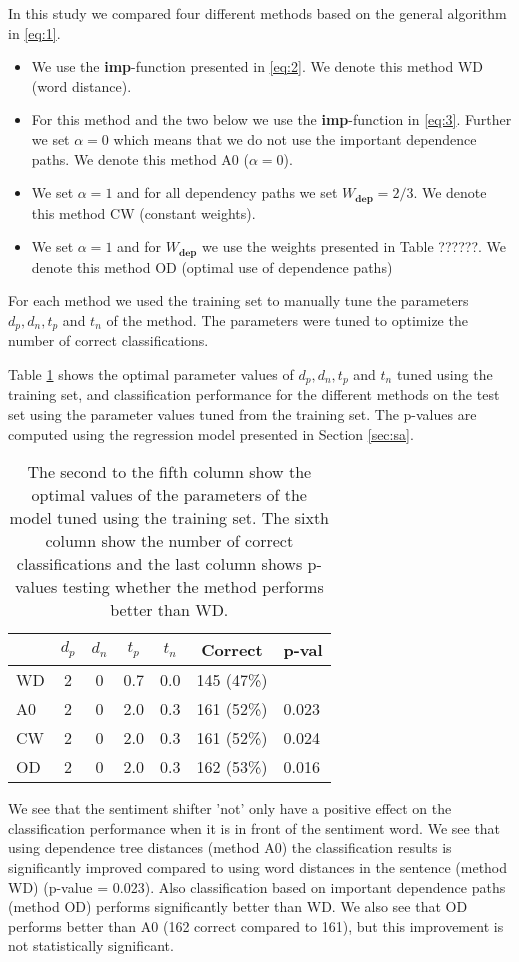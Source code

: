 \documentclass[11pt]{article}
\begin{document}
In this study we compared four different methods based on the general algorithm in \eqref{eq:1}.
\begin{itemize}
\item We use the \textbf{imp}-function presented in \eqref{eq:2}. We denote this method WD (word distance).
\item For this method and the two below we use the \textbf{imp}-function in \eqref{eq:3}. Further we set $\alpha = 0$ which means that we do not use the important dependence paths. We denote this method A0 ($\alpha = 0$).
\item We set $\alpha = 1$ and for all dependency paths we set $W_{\mathbf{dep}} = 2/3$. We denote this method CW (constant weights).
\item We set $\alpha = 1$ and for $W_{\mathbf{dep}}$ we use the weights presented in Table ??????. We denote this method OD (optimal use of dependence paths)
\end{itemize}
For each method we used the training set to manually tune the parameters $d_p, d_n, t_p$ and $t_n$ of the method. The parameters were tuned to optimize the number of correct classifications.

Table \ref{tab:2} shows the optimal parameter values of $d_p, d_n, t_p$ and $t_n$ tuned using the training set, and classification performance for the different methods on the test set using the parameter values tuned from the training set. The p-values are computed using the regression model presented in Section \ref{sec:sa}.
\begin{table}
  \caption{The second to the fifth column show the optimal values of the parameters of the model tuned using the training set. The sixth column show the number of correct classifications and the last column shows p-values testing whether the method performs better than WD.}
  \centering
  \begin{tabular}{lcccccl}
       & $d_p$ & $d_n$ & $t_p$ & $t_n$ & Correct   & p-val \\ \hline
    WD &    2  &   0  & 0.7  &  0.0  & 145 (47\%) & \\
    A0 &    2  &   0  & 2.0  &  0.3  & 161 (52\%) & 0.023\\
    CW &    2  &   0  & 2.0  &  0.3  & 161 (52\%) & 0.024\\
    OD &    2  &   0  & 2.0  &  0.3  & 162 (53\%) & 0.016
  \end{tabular}
  \label{tab:2}
\end{table}
We see that the sentiment shifter 'not' only have a positive effect on the classification performance when it is in front of the sentiment word. We see that using dependence tree distances (method A0) the classification results is significantly improved compared to using word distances in the sentence (method WD) (p-value = 0.023). Also classification based on important dependence paths (method OD) performs significantly better than WD. We also see that OD performs better than A0 (162 correct compared to 161), but this improvement is not statistically significant. 
\end{document}
